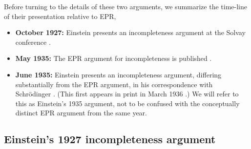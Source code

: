 \documentclass[aps,nofootinbib,12pt]{revtex4}
\begin{document}
Before turning to the details of these two arguments, we summarize
the time-line of their presentation relative to EPR,
\begin{itemize}
\item \textbf{October 1927:} Einstein presents an incompleteness argument at
the Solvay conference \cite{bac_valentini}.
\item \textbf{May 1935:} The EPR argument for incompleteness is published \cite{EPR}.
\item \textbf{June 1935:} Einstein presents an incompleteness argument,
differing substantially from the EPR argument, in his correspondence
with Schr\"{o}dinger \cite{EtoS1935}. (This first appears in print
in March 1936 \cite{EPhysik}.) We will refer to this as Einstein's
1935 argument, not to be confused with the conceptually distinct EPR
argument from the same year.
\end{itemize}


\subsection{Einstein's 1927 incompleteness argument\label{SEC:historical_1927}}
\end{document}
